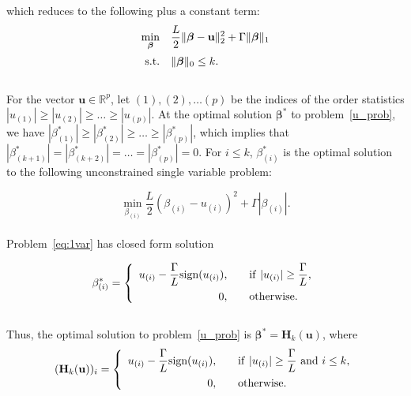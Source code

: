 \documentclass[12pt]{article}
\newcommand{\M}{\mathbf}
\newcommand{\MS}{\boldsymbol}
\newcommand{\R}{\mathbb{R}}
\newcommand{\1}{\mathds{1}}
\begin{document}
which reduces to the following plus a constant term:
\begin{equation}
\label{u_prob}
\begin{array}{rll}
  \min \limits_{\MS \beta} & \displaystyle \frac{L}{2}\|\MS \beta - \M u \|_2^2 + \Gamma \| \MS \beta \|_1 \vspace{5pt}\\
  \text{s.t.} & \| \MS \beta \|_0 \le k.
\end{array}
\end{equation}\\

For the vector $\M u \in \R^p$, let $(1), (2), \ldots (p)$ be the indices of the order statistics $|u_{(1)}| \ge |u_{(2)}| \ge \ldots \ge |u_{(p)}|$.  At the optimal solution $\MS \beta^*$ to problem~\ref{u_prob}, we have $|\beta_{(1)}^*| \ge |\beta_{(2)}^*| \ge \ldots \ge |\beta_{(p)}^*|$, which implies that $|\beta_{(k+1)}^*| = |\beta_{(k + 2)}^*| = \ldots = |\beta_{(p)}^*| = 0$.  For $i \le k$, $\beta_{(i)}^*$ is the optimal solution to the following unconstrained single variable problem:

\begin{equation}
\label{eq:1var}
\min \limits_{\beta_{(i)}} \frac{L}{2}(\beta_{(i)} - u_{(i)})^2 + \Gamma |\beta_{(i)} |.
\end{equation}\\

Problem~\ref{eq:1var} has closed form solution

\begin{equation}
\beta_{(i)}^* = \left\{\begin{array}{rl} 
u_{(i)} - \displaystyle \frac{\Gamma}{L}\text{sign}(u_{(i)}), &~~~{\rm if}~|u_{(i)}| \ge \displaystyle \frac{\Gamma}{L}, \vspace{5pt}\\
0, &~~~\rm{otherwise.}
\end{array} \right.
\end{equation}\\

Thus, the optimal solution to problem~\ref{u_prob} is $\MS \beta^* = \M H_k(\M u)$, where
\begin{equation}
(\M H_k(\M u))_i = \left\{\begin{array}{rl} 
u_{(i)} - \displaystyle \frac{\Gamma}{L}\text{sign}(u_{(i)}), &~~~{\rm if}~|u_{(i)}| \ge \displaystyle \frac{\Gamma}{L}~{\rm and}~i \le k, \vspace{5pt}\\
0, &~~~\rm{otherwise.}
\end{array} \right.
\end{equation}
\end{document}
